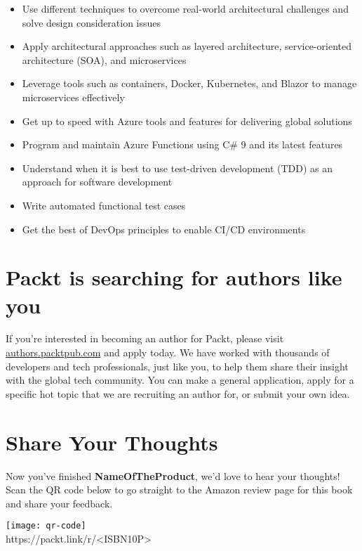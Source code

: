 \begin{flushleft}
\begin{itemize}[nosep]
    \item Use different techniques to overcome real-world architectural challenges and solve design consideration issues
    \item Apply architectural approaches such as layered architecture, service-oriented architecture (SOA), and microservices
    \item Leverage tools such as containers, Docker, Kubernetes, and Blazor to manage microservices effectively
    \item Get up to speed with Azure tools and features for delivering global solutions
    \item Program and maintain Azure Functions using C\# 9 and its latest features
    \item Understand when it is best to use test-driven development (TDD) as an approach for software development
    \item Write automated functional test cases
    \item Get the best of DevOps principles to enable CI/CD environments
\end{itemize}

\section*{Packt is searching for authors like you}
If you're interested in becoming an author for Packt, please visit \url{authors.packtpub.com} and apply today. We have worked with thousands of developers and tech professionals, just like you, to help them share their insight with the global tech community. You can make a general application, apply for a specific hot topic that we are recruiting an author for, or submit your own idea.

\vspace{0.2 cm}

\section*{Share Your Thoughts}
Now you’ve finished \textbf {NameOfTheProduct}, we’d love to hear your thoughts! Scan the QR code below to go straight to the Amazon review page for this book and share your feedback.

\begin{center}
\texttt{[image: qr-code]}\\
\small{https://packt.link/r/<ISBN10P>}
\end{center}


\end{flushleft}
